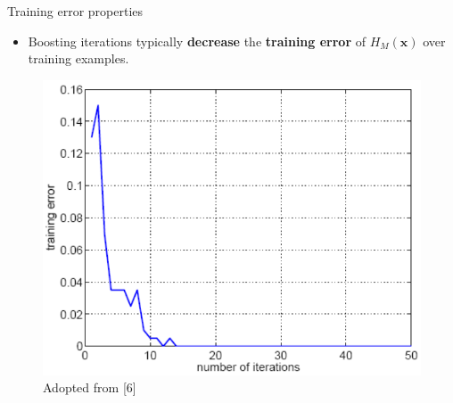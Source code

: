 \documentclass[serif, aspectratio=169]{beamer}
\begin{document}
\begin{frame}{Training error properties}
    \begin{itemize}
        \itemsep1em
        \justifying
        \item Boosting iterations typically \textbf{decrease} the \textbf{training error} of $H_M(\boldsymbol{x})$ over training examples.
    \end{itemize}
    \vfill
    \begin{center}
        \begin{figure}
            \includegraphics[width=\textwidth]{pic/boosting_train.png}
            {\scriptsize Adopted from [6]}
        \end{figure}
        \endminipage
    \end{center}
\end{frame}
\end{document}
